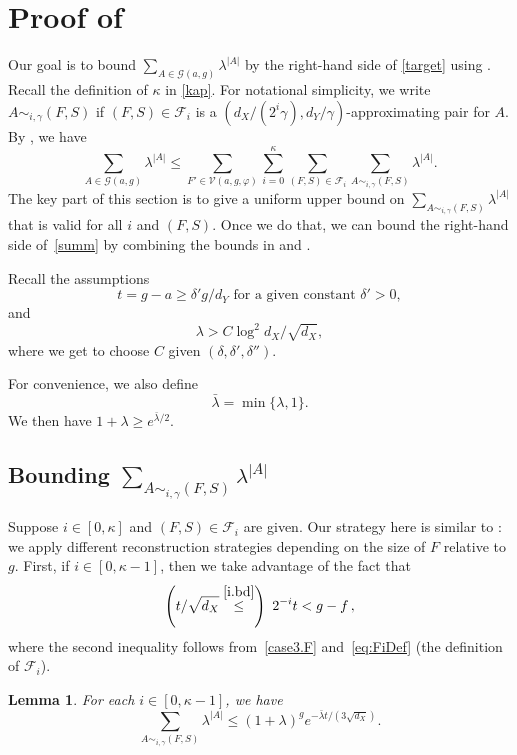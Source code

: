 \documentclass[a4paper]{amsart}
\newtheorem{lem}[thm]{Lemma}
\theoremstyle{definition}
\newcommand{\gl}{\lambda}
\newcommand{\cF}{\mathcal{F} }
\newcommand{\cG}{\mathcal{G} }
\newcommand{\cV}{\mathcal{V} }
\newcommand{\beq}[1]{\begin{equation}\label{#1}}
\newcommand{\enq}[0]{\end{equation}}
\newcommand{\gd}[0]{\delta }
\newcommand{\0}[0]{\emptyset}
\newcommand{\lam}{\lambda}
\begin{document}
\section{Proof of }\label{mlproofsec}

Our goal is to bound $\sum_{A \in \cG(a,g)} \gl^{|A|}$ by the right-hand side of \eqref{target} using . Recall the definition of $\kappa$ in \eqref{kap}. For notational simplicity, we write $A\sim_{i, \gamma}(F, S)$ if $(F,S)\in \cF_i$
is a $(d_X/(2^i\gamma),d_Y/\gamma)$-approximating pair for $A$.
By , we have
\beq{summ}\sum_{A \in \cG(a,g)} \gl^{|A|} \le \sum_{F' \in \cV(a,g,\varphi)} \sum_{i=0}^\kappa \sum_{(F,S) \in \cF_i} \sum_{A \sim_{i, \gamma} (F,S)}\gl^{|A|}.\enq
The key part of this section is to give a uniform upper bound on $\sum_{A \sim_{i, \gamma}(F,S)} \gl^{|A|}$ that is valid for all $i$ and $(F,S)$. Once we do that, we can bound the right-hand side of~\eqref{summ} by combining the bounds in  and .

Recall the assumptions
\beq{t.ass} t=g-a\ge \gd' g/d_Y \text{ for a given constant $\gd'>0$},\enq
and
\beq{gl.ass} \gl>C\log^2 d_X/\sqrt{d_X}, \enq
where we get to choose $C$ given $(\gd, \gd', \gd'')$.

For convenience, we also define
\[ \bar\lam = \min\{\lam, 1\}.\]
We then have $1+\lam\geq e^{\bar\lam/2}.$

\subsection{Bounding $\sum_{A \sim_{i, \gamma}(F,S)}\gl^{|A|}$}\label{reconstruction} Suppose $i \in [0, \kappa]$ and $(F,S) \in \cF_i$ are given. Our strategy here is similar to \cite{galvin_threshold}: we apply different reconstruction strategies depending on the size of $F$ relative to $g$. First, if $i \in [0, \kappa-1]$, then we take advantage of the fact that
\beq{2.i.bd} \left(t/\sqrt {d_X} \stackrel{\eqref{i.bd}}{\le}\right)~2^{-i}t<g-f\, , \enq
where the second inequality follows from~\eqref{case3.F} and~\eqref{eq:FiDef} (the definition of $\mathcal{F}_i$). 

\begin{lem}\label{small.F}
    For each $i \in [0, \kappa-1]$, we have
    \[\sum_{A \sim_{i, \gamma}(F,S)} \gl^{|A|} \le (1+\gl)^ge^{-\bar\gl t/(3\sqrt {d_X})}.\]
\end{lem}
\end{document}

